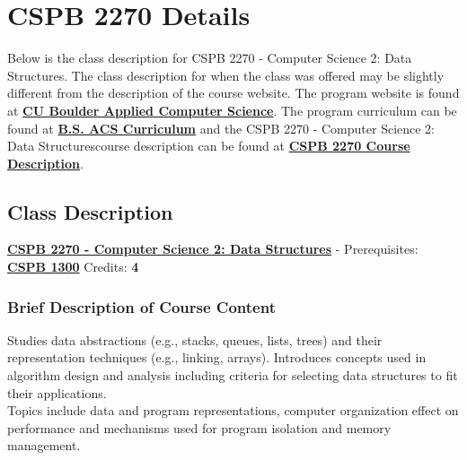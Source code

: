 \newcommand{\CSPBDataStruct}{CSPB 2270 - Computer Science 2: Data Structures}
\makeatletter
    \startcontents[sections]
    \thispagestyle{fancy}
\makeatother
\chapter{CSPB 2270 Details}
Below is the class description for \CSPBDataStruct. The class description for when the class was offered may be slightly different from the description of the course website. The program website is found at \href{https://www.colorado.edu/program/cspb/}{\textbf{CU Boulder Applied Computer Science}}. The program curriculum can be found at \href{https://www.colorado.edu/program/cspb/academics/curriculum-course-list}{\textbf{B.S. ACS Curriculum}} and the \CSPBDataStruct course description can be found at \href{https://www.colorado.edu/program/cspb/cspb-2270-computer-science-2-data-structures}{\textbf{CSPB 2270 Course Description}}.

\section{Class Description}
\horizontalline
\noindent \href{https://www.colorado.edu/program/cspb/cspb-2270-computer-science-2-data-structures}{\textbf{\CSPBDataStruct}} - Prerequisites: \href{https://www.colorado.edu/program/cspb/cspb-1300-computer-science-1-starting-computing}{\textbf{CSPB 1300}} Credits: \textbf{4}
\subsection{Brief Description of Course Content}
Studies data abstractions (e.g., stacks, queues, lists, trees) and their representation techniques (e.g., linking, arrays). Introduces concepts used in algorithm design and analysis including criteria for selecting data structures to fit their applications. \\ 

\noindent Topics include data and program representations, computer organization effect on performance and mechanisms used for program isolation and memory management. \\

